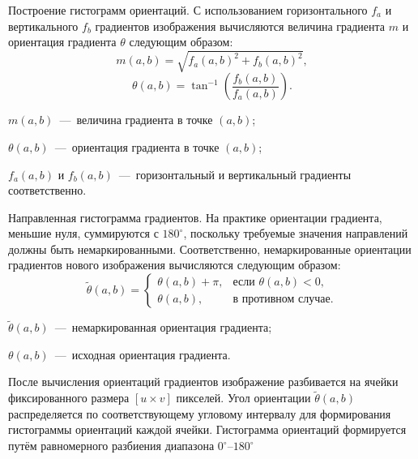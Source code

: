 Построение гистограмм ориентаций.
С использованием горизонтального $f_a$ и вертикального $f_b$ градиентов изображения вычисляются величина градиента $m$ и ориентация градиента $\theta$ следующим образом:
\begin{equation}
	m(a,b) = \sqrt{f_a(a,b)^2 + f_b(a,b)^2},
\end{equation}
\begin{equation}
	\theta(a,b) = \tan^{-1}\left(\frac{f_b(a,b)}{f_a(a,b)}\right).
\end{equation}
\begin{formulaexplanation}
	\item $m(a,b)$~---~величина градиента в точке $(a,b)$;
	\item $\theta(a,b)$~---~ориентация градиента в точке $(a,b)$;
	\item $f_a(a,b)$ и $f_b(a,b)$~---~горизонтальный и вертикальный градиенты соответственно.
\end{formulaexplanation}

Направленная гистограмма градиентов.
На практике ориентации градиента, меньшие нуля, суммируются с $180^\circ$, поскольку требуемые значения направлений должны быть немаркированными. Соответственно, немаркированные ориентации градиентов нового изображения вычисляются следующим образом:
\begin{equation}
	\tilde{\theta}(a,b) =
	\begin{cases}
		\theta(a,b) + \pi, & \text{если } \theta(a,b) < 0, \\
		\theta(a,b), & \text{в противном случае}.
	\end{cases}
\end{equation}
\begin{formulaexplanation}
	\item $\tilde{\theta}(a,b)$~---~немаркированная ориентация градиента;
	\item $\theta(a,b)$~---~исходная ориентация градиента.
\end{formulaexplanation}

После вычисления ориентаций градиентов изображение разбивается на ячейки фиксированного размера $[u \times v]$ пикселей. Угол ориентации $\tilde{\theta}(a,b)$ распределяется по соответствующему угловому интервалу для формирования гистограммы ориентаций каждой ячейки. Гистограмма ориентаций формируется путём равномерного разбиения диапазона $0^\circ$--$180^\circ$

